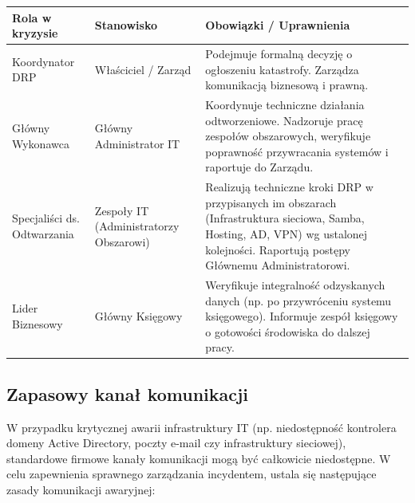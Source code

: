 \documentclass[12pt,a4paper]{article}
\begin{document}
\begin{longtable}[]{@{}>{\raggedright\arraybackslash}p{}>{\raggedright\arraybackslash}p{}>{\raggedright\arraybackslash}p{}@{}}
\toprule\noalign{}
Rola w kryzysie & Stanowisko & Obowiązki / Uprawnienia \\
\midrule\noalign{}
\endhead
\bottomrule\noalign{}
\endlastfoot
Koordynator DRP & Właściciel / Zarząd & Podejmuje formalną decyzję o ogłoszeniu katastrofy. Zarządza komunikacją biznesową i prawną. \\
Główny Wykonawca & Główny Administrator IT & Koordynuje techniczne działania odtworzeniowe. Nadzoruje pracę zespołów obszarowych, weryfikuje poprawność przywracania systemów i raportuje do Zarządu. \\
Specjaliści ds. Odtwarzania & Zespoły IT (Administratorzy Obszarowi) & Realizują techniczne kroki DRP w przypisanych im obszarach (Infrastruktura sieciowa, Samba, Hosting, AD, VPN) wg ustalonej kolejności. Raportują postępy Głównemu Administratorowi. \\
Lider Biznesowy & Główny Księgowy & Weryfikuje integralność odzyskanych danych (np. po przywróceniu systemu księgowego). Informuje zespół księgowy o gotowości środowiska do dalszej pracy. \\
\end{longtable}

\subsection{Zapasowy kanał komunikacji}\label{zapasowy-kanal-komunikacji}

W przypadku krytycznej awarii infrastruktury IT (np. niedostępność kontrolera domeny Active Directory, poczty e-mail czy infrastruktury sieciowej), standardowe firmowe kanały komunikacji mogą być całkowicie niedostępne. W celu zapewnienia sprawnego zarządzania incydentem, ustala się następujące zasady komunikacji awaryjnej:
\end{document}
